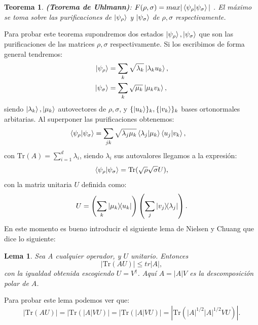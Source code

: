 \documentclass[letterpaper,12pt]{thesisECFM}
\theoremstyle{plain}
\newtheorem{thm}{Teorema}[section]
\newtheorem{lem}{Lema}[chapter]
\theoremstyle{definition}
\theoremstyle{definition}
\theoremstyle{remark}
\newcommand{\1}{\mathbb{1}}
\begin{document}
    \begin{thm}
    \textbf{(Teorema de Uhlmann)}: $F(\rho,\sigma) = max |\braket{\psi_\rho}{\psi_\sigma}|$ . El máximo se toma sobre las purificaciones de $\ket{\psi_\rho}$ y $\ket{\psi_\sigma}$ de $\rho,\sigma$ respectivamente. 
    \end{thm}
     Para probar este teorema supondremos dos estados $\ket{\psi_\rho},\ket{\psi_\sigma}$ que son las purificaciones de las matrices $\rho,\sigma$ respectivamente. Si los escribimos de forma general tendremos:
    \begin{align}
        \ket{\psi_\rho} & = \sum_k \sqrt{\lambda_k} \ket{\lambda_k u_k},\\
        \ket{\psi_\sigma} & = \sum_k \sqrt{\mu_k} \ket{\mu_k v_k},       
    \end{align}
    siendo $\ket{\lambda_k},\ket{\mu_k}$ autovectores de $\rho,\sigma$, y $\{\ket{u_k} \}_k, \{\ket{v_k} \}_k$ bases ortonormales arbitarias. Al superponer las purificaciones obtenemos:
    \begin{align}
        \braket{\psi_\rho}{\psi_\sigma} & = \sum_{jk} \sqrt{\lambda_j\mu_k} \braket{\lambda_j}{\mu_k} \braket{u_j}{v_k},
    \end{align}
    con $\text{Tr}(A) = \sum_{i=1}^{d} \lambda_i$, siendo $\lambda_i$ sus autovalores llegamos a la expresión:
    \begin{equation}
    \label{eq:rho_ij0}
        \braket{\psi_\rho}{\psi_\sigma} = \text{Tr}( \sqrt{\rho}\sqrt{\sigma} U ),
    \end{equation}
    con la matriz unitaria $U$ definida como:
    \begin{equation}
        U = \left(\sum_k \ketbra{\mu_k}{u_k}    \right)  \left(\sum_j \ketbra{v_j} {\lambda_j}   \right) .
    \end{equation} 
    En este momento es bueno introducir el siguiente lema de Nielsen y Chuang \cite{nielsen_chuang_2011} que dice lo siguiente:
    \begin{lem}  Sea A cualquier operador, y $U$ unitario. Entonces
    \begin{equation}
        | \text{Tr}(AU)| \leq tr|A|,
    \end{equation}
    con la igualdad obtenida escogiendo $U= V^\dagger$. Aquí $A= |A|V$ es la descomposición polar de $A$.
    \end{lem}
    Para probar este lema podemos ver que:
    \begin{equation}
        |\text{Tr}(AU)| = |\text{Tr}(|A|VU)| = \left| \text{Tr}(|A|VU  ) \right| = \left|\text{Tr}(|A|^{1/2}|A|^{1/2} VU )   \right|.
    \end{equation}
\end{document}
